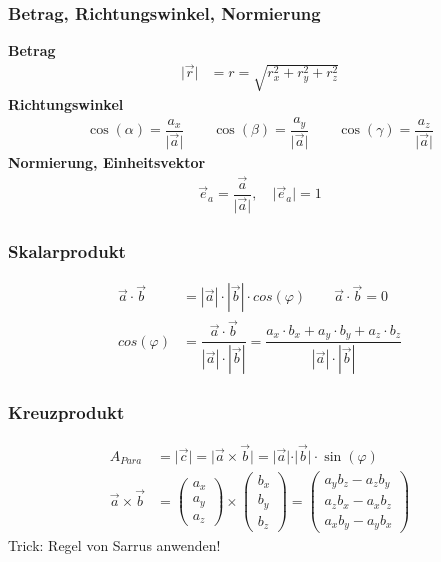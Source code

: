 \subsubsection{Betrag, Richtungswinkel, Normierung}
\textbf{Betrag}
\begin{align*}
	\vert \vec{r}  \vert & = r = \sqrt{r^2_x + r^2_y + r^2_z}
\end{align*}
\textbf{Richtungswinkel}
\begin{align*}
	\cos(\alpha) = \dfrac{a_x}{\vert \vec{a} \vert} \qquad \cos(\beta) = \dfrac{a_y}{\vert \vec{a} \vert} \qquad
	\cos(\gamma) = \dfrac{a_z}{\vert \vec{a} \vert}
\end{align*}
\textbf{Normierung, Einheitsvektor}
\begin{align*}
	\vec{e}_a =  \dfrac{\vec{a}}{\vert \vec{a} \vert}, \quad \vert \vec{e}_a \vert = 1
\end{align*}

\subsubsection{Skalarprodukt}
\begin{align*}
	\vec{a} \cdot \vec{b} & = |\vec{a}| \cdot |\vec{b}| \cdot cos(\varphi) \qquad \vec{a} \cdot \vec{b}  = 0\\
	cos(\varphi)          &  = \dfrac{\vec{a} \cdot \vec{b}}{|\vec{a}| \cdot |\vec{b}|} = \dfrac{a_x \cdot b_x + a_y \cdot b_y + a_z \cdot b_z}{|\vec{a}| \cdot |\vec{b}|}
\end{align*}

\subsubsection{Kreuzprodukt}

\begingroup
\renewcommand*{\arraystretch}{.95}
\begin{align*}
	A_{Para} & = \vert \vec{c} \vert = \vert \vec{a} \times \vec{b} \vert = \vert \vec{a} \vert \cdot \vert \vec{b} \vert \cdot \sin(\varphi)\\
	\vec{a}\times\vec{b} & =
	\begin{pmatrix}
		a_x \\
		a_y \\
		a_z
	\end{pmatrix}
	\times
	\begin{pmatrix}
		b_x \\
		b_y \\
		b_z
	\end{pmatrix} =
	\begin{pmatrix}
		a_yb_z-a_zb_y \\
		a_zb_x-a_xb_z \\
		a_xb_y-a_yb_x
	\end{pmatrix}
\end{align*}
\endgroup
Trick: Regel von Sarrus anwenden!

